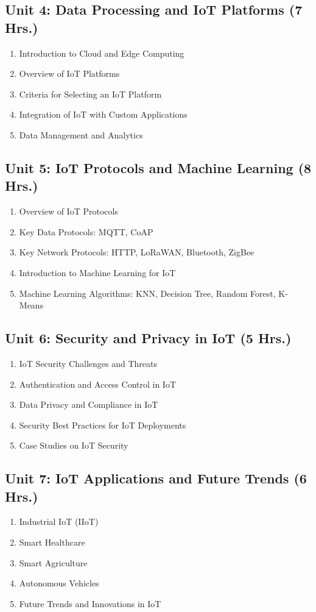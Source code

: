 \subsection*{Unit 4: Data Processing and IoT Platforms (7 Hrs.)}
\begin{enumerate}
    \item Introduction to Cloud and Edge Computing
    \item Overview of IoT Platforms
    \item Criteria for Selecting an IoT Platform
    \item Integration of IoT with Custom Applications
    \item Data Management and Analytics
\end{enumerate}

\subsection*{Unit 5: IoT Protocols and Machine Learning (8 Hrs.)}
\begin{enumerate}
    \item Overview of IoT Protocols
    \item Key Data Protocols: MQTT, CoAP
    \item Key Network Protocols: HTTP, LoRaWAN, Bluetooth, ZigBee
    \item Introduction to Machine Learning for IoT
    \item Machine Learning Algorithms: KNN, Decision Tree, Random Forest, K-Means
\end{enumerate}

\subsection*{Unit 6: Security and Privacy in IoT (5 Hrs.)}
\begin{enumerate}
    \item IoT Security Challenges and Threats
    \item Authentication and Access Control in IoT
    \item Data Privacy and Compliance in IoT
    \item Security Best Practices for IoT Deployments
    \item Case Studies on IoT Security
\end{enumerate}

\subsection*{Unit 7: IoT Applications and Future Trends (6 Hrs.)}
\begin{enumerate}
    \item Industrial IoT (IIoT)
    \item Smart Healthcare
    \item Smart Agriculture
    \item Autonomous Vehicles
    \item Future Trends and Innovations in IoT
\end{enumerate}